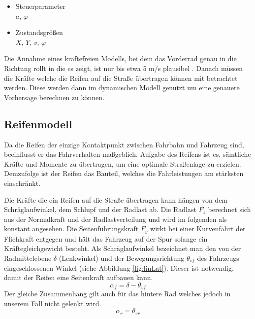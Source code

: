 \documentclass{like}
\begin{document}
\begin{itemize}
	\item Steuerparameter  \\
			\(a\), \(\varphi\)
	\item Zustandsgrößen \\
			\(X\), \(Y\), \(v\), \(\varphi\)
	
\end{itemize}


Die Annahme eines kräftefreien Modells, bei dem das Vorderrad genau in die Richtung rollt in die es zeigt, ist nur bis etwa 5 m/s plausibel \cite{rajamani2011vehicle}. Danach müssen die Kräfte welche die Reifen auf die Straße übertragen können mit betrachtet werden. Diese werden dann im dynamischen Modell genutzt um eine genauere Vorhersage berechnen zu können.



\subsection{Reifenmodell}
\label{tireModel}
Da die Reifen der einzige Kontaktpunkt zwischen Fahrbahn und Fahrzeug sind,  beeinflusst er das Fahrverhalten maßgeblich. Aufgabe des Reifens ist es, sämtliche Kräfte und Momente zu übertragen, um eine optimale Straßenlage zu erzielen. Demzufolge ist der Reifen das Bauteil, welches die Fahrleistungen am stärksten einschränkt.

Die Kräfte die ein Reifen auf die Straße übertragen kann hängen von dem Schräglaufwinkel, dem Schlupf und der Radlast ab. Die Radlast \(F_z\) berechnet sich aus der Normalkraft und der Radlastverteilung und wird im folgenden als konstant angesehen.
Die Seitenführungskraft \(F_y\) wirkt bei einer Kurvenfahrt der Fliehkraft entgegen und hält das Fahrzeug auf der Spur solange ein Kräftegleichgewicht besteht. Als Schräglaufwinkel bezeichnet man den von der Radmittelebene \(\delta\) (Lenkwinkel) und der Bewegungsrichtung \(\theta_{vf}\) des Fahrzeugs eingeschlossenen Winkel (siehe Abbildung \ref{fig:linLat}). Dieser ist notwendig, damit der Reifen eine Seitenkraft aufbauen kann. \\

\begin{equation}
\alpha_f = \delta - \theta_{vf}
\end{equation}
Der gleiche Zusammenhang gilt auch für das hintere Rad welches jedoch in unserem Fall nicht gelenkt wird.
\begin{equation}
\alpha_r = \theta_{vr}
\end{equation}
\end{document}
